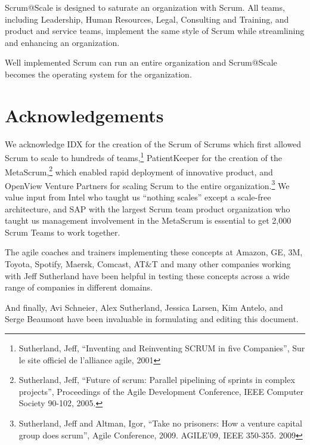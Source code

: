 \documentclass[12pt,a4paper,parskip=full]{scrartcl}
\begin{document}
Scrum@Scale is designed to saturate an organization with Scrum. All teams, including Leadership, Human Resources, Legal, Consulting and Training, and product and service teams, implement the same style of Scrum while streamlining and enhancing an organization.

Well implemented Scrum can run an entire organization and Scrum@Scale becomes the operating system for the organization.

\section{Acknowledgements}

We acknowledge IDX for the creation of the Scrum of Scrums which first allowed Scrum to scale to hundreds of teams,\footnote{Sutherland, Jeff, ``Inventing and Reinventing SCRUM in five Companies'', Sur le site officiel de l'alliance agile, 2001} PatientKeeper for the creation of the MetaScrum,\footnote{Sutherland, Jeff, ``Future of scrum: Parallel pipelining of sprints in complex projects'', Proceedings of the Agile Development Conference,  IEEE Computer Society 90-102,  2005.} which enabled rapid deployment of innovative product, and OpenView Venture Partners for scaling Scrum to the entire organization.\footnote{Sutherland, Jeff and Altman, Igor, ``Take no prisoners: How a venture capital group does scrum'', Agile Conference, 2009. AGILE'09, IEEE 350-355.  2009} We value input from Intel who taught us ``nothing scales'' except a scale-free architecture, and SAP with the largest Scrum team product organization who taught us management involvement in the MetaScrum is essential to get 2,000 Scrum Teams to work together.

The agile coaches and trainers implementing these concepts at Amazon, GE, 3M, Toyota, Spotify, Maersk, Comcast, AT\&T and many other companies working with Jeff Sutherland have been helpful in testing these concepts across a wide range of companies in different domains.

And finally, Avi Schneier, Alex Sutherland, Jessica Larsen, Kim Antelo, and Serge Beaumont have been invaluable in formulating and editing this document.

\pagebreak

\printbibliography
\end{document}
